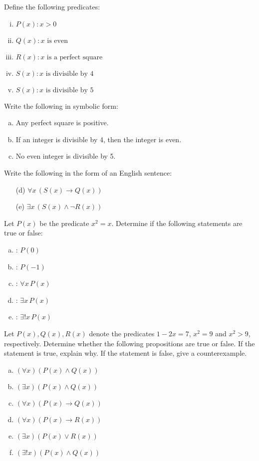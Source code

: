 \documentclass[11pt,letterpaper]{article}
\begin{document}
 Define the following predicates:
	\begin{enumerate}[(i)]
	\item $P(x) \colon x > 0$
	\item $Q(x) \colon x \text{ is even}$
	\item $R(x) \colon x \text{ is a perfect square}$
	\item $S(x) \colon x \text{ is divisible by }4$
	\item $S(x) \colon x \text{ is divisible by }5$
	\end{enumerate}
Write the following in symbolic form:
	\begin{enumerate}[(a)]
	\item Any perfect square is positive. 
	\item If an integer is divisible by 4, then the integer is even. 
	\item No even integer is divisible by 5. 
	\end{enumerate}
Write the following in the form of an English sentence:
	\begin{enumerate}
	\item[(d)] $\forall x\, (S(x) \to Q(x))$
	\item[(e)] $\exists x\, (S(x) \wedge \neg R(x))$
	\end{enumerate}



\newpage



 Let $P(x)$ be the predicate $x^2= x$. Determine if the following statements are true or false:
	\begin{enumerate}[(a)]
	\item \uans{1.5cm}: $P(0)$
	\item \uans{1.5cm}: $P(-1)$
	\item \uans{1.5cm}: $\forall x\, P(x)$
	\item \uans{1.5cm}: $\exists x\, P(x)$
	\item \uans{1.5cm}: $\exists! x\, P(x)$
	\end{enumerate}



\newpage



 Let $P(x), Q(x), R(x)$ denote the predicates $1 - 2x= 7$, $x^2= 9$ and $x^2 > 9$, respectively. Determine whether the following propositions are true or false. If the statement is true, explain why. If the statement is false, give a counterexample. 
        \begin{enumerate}[(a)]
        \item $(\forall x)(P(x) \wedge Q(x))$
        \item $(\exists x)(P(x) \wedge Q(x))$
        \item $(\forall x)(P(x) \to Q(x))$
        \item $(\forall x)(P(x) \to R(x))$
        \item $(\exists x)(P(x) \vee R(x))$
        \item $(\exists! x)(P(x) \wedge Q(x))$ 
        \end{enumerate}
\end{document}
